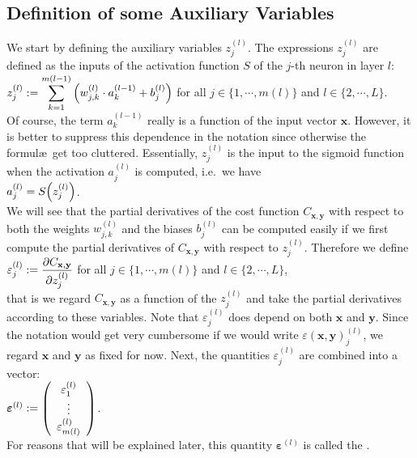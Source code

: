 \subsection{Definition of some Auxiliary Variables}
We start by defining the auxiliary variables $z_j^{(l)}$.
 The expressions $z_j^{(l)}$  are defined as the inputs of the activation function $S$ of the $j$-th neuron in
 layer $l$:
\\[0.2cm]
\hspace*{1.3cm}
$\displaystyle z_j^{(l)} := \sum\limits_{k=1}^{m(l-1)}  \left(w_{j,k}^{(l)} \cdot a_k^{(l-1)} + b_j^{(l)}\right)$
\quad for all  $j \in \{1, \cdots, m(l)\}$ and $l \in \{2,\cdots,L\}$.
\\[0.2cm]
Of course, the term  $a_k^{(l-1)}$ really is a function of the input vector $\mathbf{x}$.  However, it is better to suppress
this dependence in the notation since otherwise the formul\ae\ get too cluttered.
Essentially, $z_j^{(l)}$ is the input to the sigmoid function when the activation $a_j^{(l)}$ is computed,
i.e.~we have
\\[0.2cm]
\hspace*{1.3cm}
$a_j^{(l)} = S\Bigl(z_j^{(l)}\Bigr)$.
\\[0.2cm]
We will see that the partial derivatives of the cost function $C_{\mathbf{x}, \mathbf{y}}$ with respect to both the weights
$w_{j,k}^{(l)}$ and the biases $b_j^{(l)}$ can be computed easily if we first compute the partial derivatives
of $C_{\mathbf{x}, \mathbf{y}}$ with respect to $z_j^{(l)}$.  Therefore we define
\\[0.2cm]
\hspace*{1.3cm}
$\displaystyle\varepsilon_j^{(l)} := \frac{\partial C_{\mathbf{x}, \mathbf{y}}}{\partial z_j^{(l)}}$ \quad for all $j \in \{1, \cdots, m(l)\}$ and $l \in \{2,\cdots, L\}$,
\\[0.2cm]
that is we regard $C_{\mathbf{x}, \mathbf{y}}$ as a function of the $z_j^{(l)}$ and take the partial
derivatives according to these variables.  
Note that $\varepsilon_j^{(l)}$ does depend on both $\mathbf{x}$ and $\mathbf{y}$.  Since the notation would
get very cumbersome if we would write $\varepsilon(\mathbf{x}, \mathbf{y})_j^{(l)}$, we regard $\mathbf{x}$ and
$\mathbf{y}$ as fixed for now.  Next, the quantities $\varepsilon_j^{(l)}$ are combined into a vector:
\\[0.2cm]
\hspace*{1.3cm}
$\boldsymbol{\varepsilon}^{(l)} := \left(
  \begin{array}[c]{c}
    \varepsilon_1^{(l)}      \\
    \vdots             \\
    \varepsilon_{m(l)}^{(l)}  
  \end{array}
  \right)
$.
\\[0.2cm]
For reasons that will be explained later, this quantity $\boldsymbol{\varepsilon}^{(l)}$ is called the .

